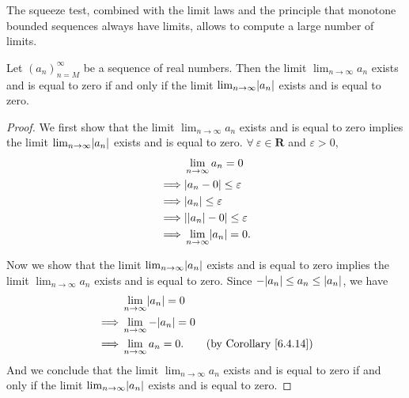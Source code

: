\setcounter{theorem}{15}
\begin{remark}\label{6.4.16}
    The squeeze test, combined with the limit laws and the principle that monotone bounded sequences always have limits, allows to compute a large number of limits.
\end{remark}

\begin{corollary}\label{6.4.17}
    Let \((a_n)_{n = M}^\infty\) be a sequence of real numbers.
    Then the limit \(\lim_{n \to \infty} a_n\) exists and is equal to zero if and only if the limit \(\lim_{n \to \infty} \abs*{a_n}\) exists and is equal to zero.
\end{corollary}

\begin{proof}
    We first show that the limit \(\lim_{n \to \infty} a_n\) exists and is equal to zero implies the limit \(\lim_{n \to \infty} \abs*{a_n}\) exists and is equal to zero.
    \(\forall\ \varepsilon \in \mathbf{R}\) and \(\varepsilon > 0\),
    \begin{align*}
                 & \lim_{n \to \infty} a_n = 0            \\
        \implies & \abs*{a_n - 0} \leq \varepsilon        \\
        \implies & \abs*{a_n} \leq \varepsilon            \\
        \implies & \abs*{\abs*{a_n} - 0} \leq \varepsilon \\
        \implies & \lim_{n \to \infty} \abs*{a_n} = 0.
    \end{align*}

    Now we show that the limit \(\lim_{n \to \infty} \abs*{a_n}\) exists and is equal to zero implies the limit \(\lim_{n \to \infty} a_n\) exists and is equal to zero.
    Since \(-\abs*{a_n} \leq a_n \leq \abs*{a_n}\), we have
    \begin{align*}
                 & \lim_{n \to \infty} \abs*{a_n} = 0                                       \\
        \implies & \lim_{n \to \infty} -\abs*{a_n} = 0                                      \\
        \implies & \lim_{n \to \infty} a_n = 0.        & \text{(by Corollary \ref{6.4.14})}
    \end{align*}
    And we conclude that the limit \(\lim_{n \to \infty} a_n\) exists and is equal to zero if and only if the limit \(\lim_{n \to \infty} \abs*{a_n}\) exists and is equal to zero.
\end{proof}

